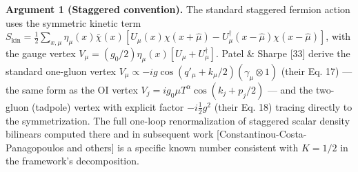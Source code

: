 \documentclass[
]{article}
\begin{document}
\textbf{Argument 1 (Staggered convention).} The standard staggered
fermion action uses the symmetric kinetic term
\(S_{\text{kin}} = \tfrac{1}{2}\sum_{x,\mu}\eta_\mu(x)\bar\chi(x)[U_\mu(x)\chi(x+\hat\mu) - U_\mu^\dagger(x-\hat\mu)\chi(x-\hat\mu)]\),
with the gauge vertex
\(V_\mu = (g_0/2)\eta_\mu(x)[U_\mu + U_\mu^\dagger]\). Patel \& Sharpe
{[}33{]} derive the standard one-gluon vertex
\(V_\mu \propto -ig\cos(q'_\mu + k_\mu/2)(\gamma_\mu \otimes 1)\) (their
Eq. 17) --- the same form as the OI vertex
\(V_j = ig_0\mu T^\alpha\cos(k_j + p_j/2)\) --- and the two-gluon
(tadpole) vertex with explicit factor \(-i\tfrac{1}{2}g^2\) (their Eq.
18) tracing directly to the symmetrization. The full one-loop
renormalization of staggered scalar density bilinears computed there and
in subsequent work {[}Constantinou-Costa-Panagopoulos and others{]} is a
specific known number consistent with \(K = 1/2\) in the framework's
decomposition.
\end{document}
